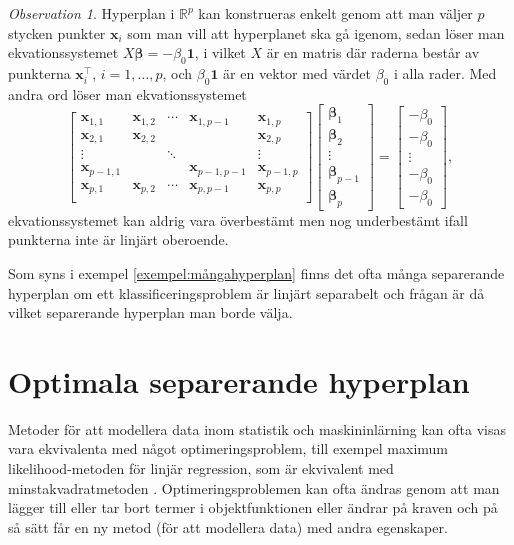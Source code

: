 \documentclass[a4paper, 12pt]{report}
\theoremstyle{definition}
\theoremstyle{remark}
\newtheorem*{rem}{Observation}
\newcommand{\bfbeta}{{\boldsymbol{\beta}}}
\newcommand{\bfx}{\mathbf{x}}
\begin{document}
\begin{rem}
	Hyperplan i $\mathbb{R}^p$ kan konstrueras enkelt genom att man väljer $p$ stycken punkter $\mathbf{x}_i$ som man vill att hyperplanet ska gå igenom, sedan löser man ekvationssystemet $X\bfbeta=-\beta_0\mathbf{1}$, i vilket $X$ är en matris där raderna består av punkterna $\mathbf{x}_i^\intercal$, $i=1,\dots, p$, och $\beta_0\mathbf{1}$ är en vektor med värdet $\beta_0$ i alla rader.
	Med andra ord löser man ekvationssystemet
	\begin{equation*}
		\begin{bmatrix}
		\bfx_{1,1}	& \bfx_{1,2}	& \cdots	& \bfx_{1,p-1}	& \bfx_{1,p}\\
		\bfx_{2,1}	& \bfx_{2,2}	&  			& 				& \bfx_{2,p}\\
		\vdots		&				& \ddots	&				& \vdots\\
		\bfx_{p-1,1}& 				&  			& \bfx_{p-1,p-1}	&\bfx_{p-1,p}\\
		\bfx_{p,1}	& \bfx_{p,2}	& \cdots	& \bfx_{p,p-1}	& \bfx_{p,p}\\
		\end{bmatrix}
		\begin{bmatrix}
		\bfbeta_1\\ \bfbeta_2\\\vdots\\\bfbeta_{p-1}\\\bfbeta_{p}
		\end{bmatrix}=
		\begin{bmatrix}
		-\beta_0\\-\beta_0\\\vdots\\-\beta_0\\-\beta_0
		\end{bmatrix},
	\end{equation*}
	ekvationssystemet kan aldrig vara överbestämt men nog underbestämt ifall punkterna inte är linjärt oberoende.
\end{rem}

Som syns i exempel \ref{exempel:mångahyperplan} finns det ofta många separerande hyperplan om ett klassificeringsproblem är linjärt separabelt och frågan är då vilket separerande hyperplan man borde välja.

\section{Optimala separerande hyperplan}
Metoder för att modellera data inom statistik och maskininlärning kan ofta visas vara ekvivalenta med något optimeringsproblem, till exempel maximum likelihood-metoden för linjär regression, som är ekvivalent med minstakvadratmetoden \cite{MLEOLS}.
Optimeringsproblemen kan ofta ändras genom att man lägger till eller tar bort termer i objektfunktionen eller ändrar på kraven och på så sätt får en ny metod (för att modellera data) med andra egenskaper.
\end{document}
